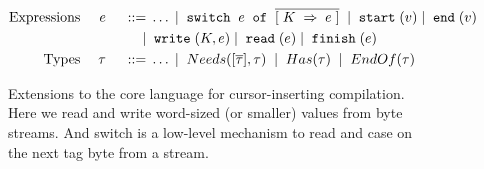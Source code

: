 
\begin{figure}
  \vspace{-5mm}
  \begin{displaymath}
    \begin{aligned}
      \textup{Expressions} && \; {e} \; && 
     \; ::= \; & \ldots \; | \; \; \texttt{switch} \;{}\; e\; \; \texttt{of} \;\; \overline{[{\; {K} \;} \Rightarrow {\; {e} \;}]} \; 
     \; | \; \; \texttt{start} \;(v) \; | \; \; \texttt{end} \;(v)
      \\
      && && \; | \; & \; \texttt{write} \;(K,e) \; | \; \; \texttt{read} \;(e) \; | \;
      \; \texttt{finish} \;(e) \\      
      \textup{Types} && \; {\tau} \; && \; ::= \; & \ldots \; | \; \; Needs([\overline{\tau}],\tau) \; \; | \; \; Has(\tau) \; 
\; | \; \; EndOf(\tau) \; \\
    \end{aligned}
  \end{displaymath}
  \vspace{-4mm}
  \caption{Extensions to the core language for cursor-inserting compilation.
    Here we read and write word-sized (or smaller) values from byte streams. And
    switch is a low-level mechanism to read and case on the next tag byte from a
    stream.}
  \label{fig:target}
\end{figure}

